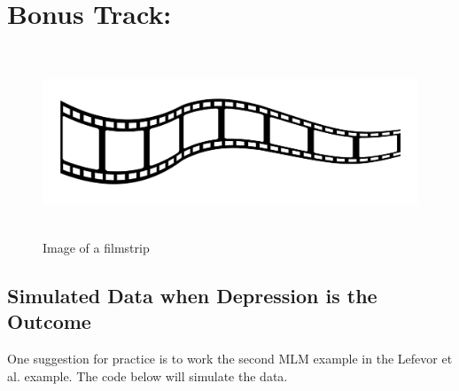 \documentclass[
  english,
]{book}
\begin{document}
\hypertarget{bonus-track-1}{%
\section{Bonus Track:}\label{bonus-track-1}}

\begin{figure}
\hypertarget{id}{%
\centering
\includegraphics[width=6.45833in,height=2.19792in]{images/film-strip-1.jpg}
\caption{Image of a filmstrip}\label{id}
}
\end{figure}

\hypertarget{simulated-data-when-depression-is-the-outcome}{%
\subsection{Simulated Data when Depression is the Outcome}\label{simulated-data-when-depression-is-the-outcome}}

One suggestion for practice is to work the second MLM example in the Lefevor et al. \citep{lefevor_religious_2017} example. The code below will simulate the data.
\end{document}
